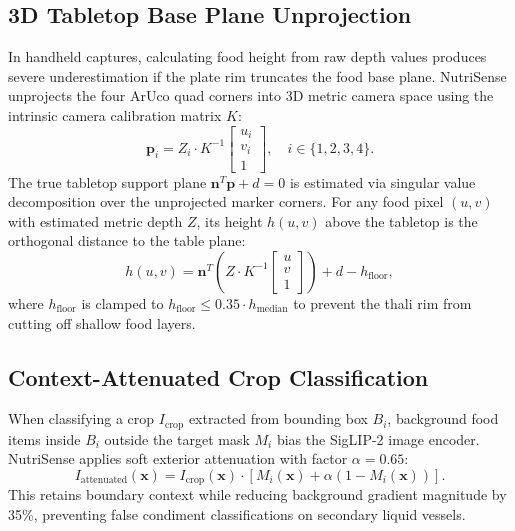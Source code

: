 \documentclass[conference]{IEEEtran}
\begin{document}
\subsection{3D Tabletop Base Plane Unprojection}
In handheld captures, calculating food height from raw depth values produces severe underestimation if the plate rim truncates the food base plane. NutriSense unprojects the four ArUco quad corners into 3D metric camera space using the intrinsic camera calibration matrix $K$:
\begin{equation}
\mathbf{p}_i = Z_i \cdot K^{-1} \begin{bmatrix} u_i \\ v_i \\ 1 \end{bmatrix}, \quad i \in \{1, 2, 3, 4\}.
\end{equation}
The true tabletop support plane $\mathbf{n}^T \mathbf{p} + d = 0$ is estimated via singular value decomposition over the unprojected marker corners. For any food pixel $(u, v)$ with estimated metric depth $Z$, its height $h(u, v)$ above the tabletop is the orthogonal distance to the table plane:
\begin{equation}
h(u, v) = \mathbf{n}^T \left( Z \cdot K^{-1} \begin{bmatrix} u \\ v \\ 1 \end{bmatrix} \right) + d - h_{\mathrm{floor}},
\end{equation}
where $h_{\mathrm{floor}}$ is clamped to $h_{\mathrm{floor}} \le 0.35 \cdot h_{\mathrm{median}}$ to prevent the thali rim from cutting off shallow food layers.

\subsection{Context-Attenuated Crop Classification}
When classifying a crop $I_{\mathrm{crop}}$ extracted from bounding box $B_i$, background food items inside $B_i$ outside the target mask $M_i$ bias the SigLIP-2 image encoder. NutriSense applies soft exterior attenuation with factor $\alpha = 0.65$:
\begin{equation}
I_{\mathrm{attenuated}}(\mathbf{x}) = I_{\mathrm{crop}}(\mathbf{x}) \cdot \left[ M_i(\mathbf{x}) + \alpha \left(1 - M_i(\mathbf{x})\right) \right].
\end{equation}
This retains boundary context while reducing background gradient magnitude by 35\%, preventing false condiment classifications on secondary liquid vessels.
\end{document}
